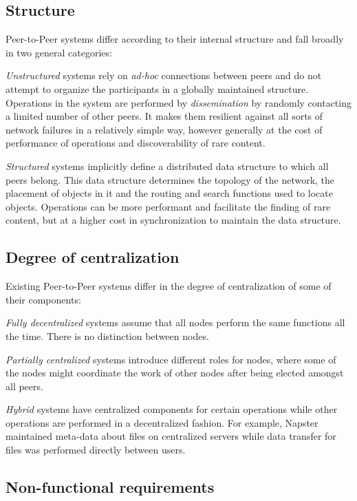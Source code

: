 \subsection{Structure}

Peer-to-Peer systems differ according to their internal structure and fall broadly in two general categories: 

\textit{Unstructured} systems rely on \textit{ad-hoc} connections between peers and do not attempt to organize the participants in a globally maintained structure. Operations in the system are performed by \textit{dissemination} by randomly contacting a limited number of other peers. It makes them resilient against all sorts of network failures in a relatively simple way, however generally at the cost of performance of operations and discoverability of rare content.

\textit{Structured} systems implicitly define a distributed data structure to which all peers belong. This data structure determines the topology of the network, the placement of objects in it and the routing and search functions used to locate objects. Operations can be more performant and facilitate the finding of rare content, but at a higher cost in synchronization to maintain the data structure.

\subsection{Degree of centralization}

Existing Peer-to-Peer systems differ in the degree of centralization of some of their components:

\textit{Fully decentralized} systems assume that all nodes perform the same functions all the time. There is no distinction between nodes.

\textit{Partially centralized} systems introduce different roles for nodes, where some of the nodes might coordinate the work of other nodes after being elected amongst all peers.

\textit{Hybrid} systems have centralized components for certain operations while other operations are performed in a decentralized fashion. For example, Napster maintained meta-data about files on centralized servers while data transfer for files was performed directly between users.

\subsection{Non-functional requirements}
\label{sec:NonFunctionalProperties}

